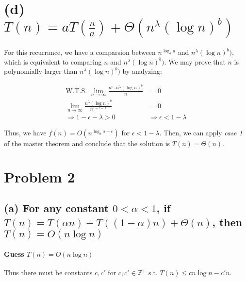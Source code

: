 \documentclass[11pt]{article}
\begin{document}
\section{(d) $T(n) = aT(\frac{n}{a}) + \Theta(n^{\lambda}(\log n)^b)$}
For this recurrance, we have a comparsion between $n^{\log_a a}$ and $n^{\lambda}(\log n)^b)$, which is equivalent to comparing $n$ and $n^{\lambda}(\log n)^b)$. We may prove that $n$ is polynomially larger than $n^{\lambda}(\log n)^b)$ by analyzing:

\begin{align}
    \text{W.T.S. \ }\lim_{n \to \infty} \frac{n^\epsilon \cdot n^\lambda (\log n)^b}{n} &= 0\\
    \lim_{n \to \infty} \frac{n^\lambda (\log n)^b}{n^{1-\epsilon - \lambda}} &= 0 \nonumber\\
    \Longrightarrow 1-\epsilon - \lambda > 0 &\Rightarrow \epsilon < 1 - \lambda
\end{align}

Thus, we have $f(n) = O(n^{\log_b a - \epsilon})$ for $\epsilon < 1 - \lambda$. Then, we can apply \textit{case 1} of the master theorem and conclude that the solution is $T(n) = \Theta(n)$.




\section{Problem 2}


\subsection{(a) For any constant $0 < \alpha < 1$, if $T(n) = T(\alpha n) + T((1-\alpha)n) + \Theta(n)$, then $T(n) = O(n \log n)$}


\paragraph{Guess $T(n) = O(n \log n)$\newline}
Thus there must be constants $c, c'$ for $c, c'\in \mathbb{Z^+}$ s.t. $T(n) \leq cn \log n - c'n$.
\end{document}
